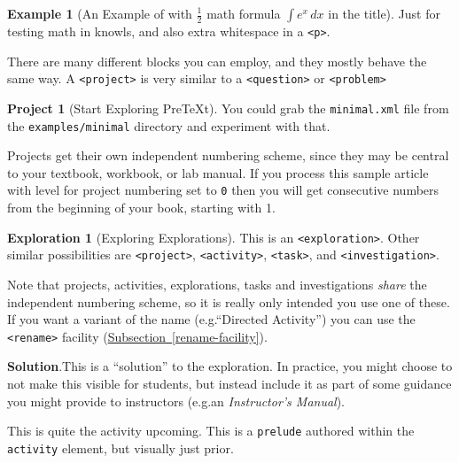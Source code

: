 \documentclass{amsart}
\theoremstyle{plain}%
\theoremstyle{definition}%
\newtheorem{exploration}[theorem]{Exploration}
\newtheorem{example}[theorem]{Example}
\newtheorem{project}[theorem]{Project}
\theoremstyle{remark}%
\newcommand{\blocktitlefont}{\relax}
\newcommand{\xreffont}{\relax}
\newcommand{\mono}[1]{\texttt{#1}}
\newcommand{\pubtitle}[1]{\textsl{#1}}
\numberwithin{equation}{section}
\begin{document}
\begin{example}[An Example of with \(\frac12\) math formula \(\displaystyle{\int e^x \, dx}\) in the title]\label{example-math-title}%
%
Just for testing math in knowls, and also extra whitespace in a \mono{<p>}.%
\end{example}
There are many different blocks you can employ, and they mostly behave the same way.  A \mono{<project>} is very similar to a \mono{<question>} or \mono{<problem>}%
\begin{project}[Start Exploring PreTeXt]\label{section-interesting-corollary-5-3-8}%
%
You could grab the \mono{minimal.xml} file from the \mono{examples/minimal} directory and experiment with that.%
\par
Projects get their own independent numbering scheme, since they may be central to your textbook, workbook, or lab manual.  If you process this sample article with level for project numbering set to \mono{0} then you will get consecutive numbers from the beginning of your book, starting with 1.%
\end{project}%
\begin{exploration}[Exploring Explorations]\label{section-interesting-corollary-5-3-9}%
%
This is an \mono{<exploration>}.  Other similar possibilities are \mono{<project>}, \mono{<activity>}, \mono{<task>}, and \mono{<investigation>}.%
\par
Note that projects, activities, explorations, tasks and investigations \emph{share} the independent numbering scheme, so it is really only intended you use one of these.  If you want a variant of the name (e.g.\@ ``Directed Activity'') you can use the \mono{<rename>} facility (\hyperref[rename-facility]{Subsection~{\xreffont\ref{rename-facility}}}).%
\par\smallskip%
\noindent\textbf{\blocktitlefont Solution}.\hypertarget{section-interesting-corollary-5-3-9-3}{}\quad{}This is a ``solution'' to the exploration.  In practice, you might choose to not make this visible for students, but instead include it as part of some guidance you might provide to instructors (e.g.\@ an \pubtitle{Instructor's Manual}).%
\end{exploration}%
\par
This is quite the activity upcoming.  This is a \mono{prelude} authored within the \mono{activity} element, but visually just prior.%
\end{document}
